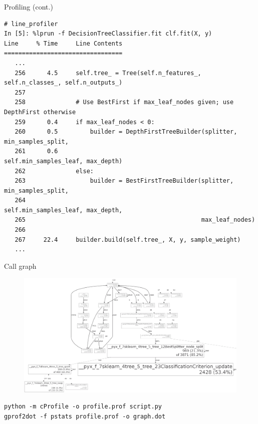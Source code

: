 \documentclass{beamer}
\begin{document}
\begin{frame}[fragile]{Profiling (cont.)}

\begin{verbatim}
# line_profiler
In [5]: %lprun -f DecisionTreeClassifier.fit clf.fit(X, y)
Line     % Time     Line Contents
=================================
   ...
   256      4.5     self.tree_ = Tree(self.n_features_, self.n_classes_, self.n_outputs_)
   257
   258              # Use BestFirst if max_leaf_nodes given; use DepthFirst otherwise
   259      0.4     if max_leaf_nodes < 0:
   260      0.5         builder = DepthFirstTreeBuilder(splitter, min_samples_split,
   261      0.6                                         self.min_samples_leaf, max_depth)
   262              else:
   263                  builder = BestFirstTreeBuilder(splitter, min_samples_split,
   264                                                 self.min_samples_leaf, max_depth,
   265                                                 max_leaf_nodes)
   266
   267     22.4     builder.build(self.tree_, X, y, sample_weight)
   ...
\end{verbatim}


\end{frame}

\begin{frame}[fragile]{Call graph}
\vspace{-0.65cm}

\begin{figure}
\hspace*{-1.5cm}\includegraphics[scale=0.2]{./figures/graph.png}
\end{figure}

\footnotesize
\begin{verbatim}
python -m cProfile -o profile.prof script.py
gprof2dot -f pstats profile.prof -o graph.dot
\end{verbatim}

\end{frame}
\end{document}
